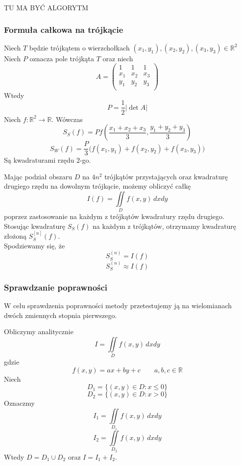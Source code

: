 \documentclass[9pt]{beamer}
\begin{document}
\begin{frame}
    TU MA BYĆ ALGORYTM
\end{frame}


\begin{frame}
    \frametitle{Formuła całkowa na trójkącie}
    Niech $T$ będzie trójkątem o wierzchołkach $(x_1,y_1), (x_2,y_2), (x_3,y_3) \in \mathbb{R}^2$
    Niech $P$ oznacza pole trójkąta $T$ oraz niech 
    $$ A = \begin{pmatrix}
    	1 & 1 & 1 \\
    	x_1 & x_2 & x_3 \\
    	y_1 & y_2 & y_3 \\
    \end{pmatrix} $$
    Wtedy $$P = \frac{1}{2}|\det{A}|$$
    Niech $f : \mathbb{R}^2 \to \mathbb{R}$. Wówczas 
    $$S_S(f) = P f \left(\frac{x_1+x_2+x_3}{3},\frac{y_1+y_2+y_3}{3} \right) $$
    $$S_W(f) = \frac{P}{3} \Big( f(x_1,y_1) + f(x_2,y_2) + f(x_3,y_3) \Big)$$
    Są kwadraturami rzędu 2-go.
    
\end{frame}

\begin{frame}
	 \begin{spacing}{1.5}
	Mając podział obszaru $D$ na $4n^2$ trójkątów przystających oraz kwadraturę drugiego rzędu na dowolnym trójkącie, możemy obliczyć całkę $$ I(f) = \iint\limits_D f(x,y)  \, dxdy $$ poprzez zastosowanie na każdym z trójkątów kwadratury rzędu drugiego.\\
	
	Stosując kwadraturę $S_S(f)$ na każdym z trójkątów, otrzymamy kwadraturę złożoną $S_S^{[n]}(f)$.\\
	
	Spodziewamy się, że 
	$$ S_S^{(n)} = I(f) $$ 
	$$ S_S^{(n)} \approx I(f) $$	

	\end{spacing}
\end{frame}

\begin{frame}
\frametitle{Sprawdzanie poprawności}

    \begin{spacing}{1}
        W celu sprawdzenia poprawności metody przetestujemy ją na wielomianach dwóch zmiennych stopnia pierwszego.\par
        Obliczymy analitycznie 
        $$ I = \iint\limits_D f(x,y) \, dx dy $$ 
        gdzie
        $$ f(x,y) = ax + by + c \qquad a,b,c \in \mathbb{R}$$
        Niech 
        $$ D_1 = \{(x,y) \in D : x \leq 0\} $$ 
        $$ D_2 = \{(x,y) \in D : x > 0\} $$ 
        Oznaczmy 
        $$ I_1 = \iint\limits_{D_1} f(x,y) \, dx dy $$ 
        $$ I_2 = \iint\limits_{D_2} f(x,y) \, dx dy $$ 
        Wtedy $ D = D_1 \cup D_2 $ oraz $ I = I_1 + I_2 $.
    \end{spacing}

\end{frame}
\end{document}
